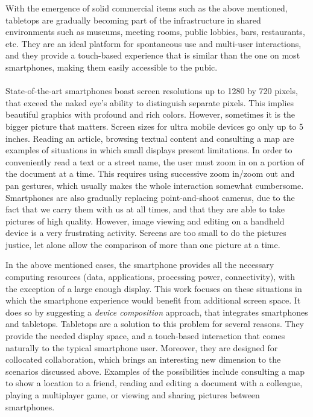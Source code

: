 With the emergence of solid commercial items such as the above mentioned, tabletops are gradually becoming part of the infrastructure in shared environments such as museums, meeting rooms, public lobbies, bars, restaurants, etc.
They are an ideal platform for spontaneous use and multi-user interactions, and they provide a touch-based experience that is similar than the one on most smartphones, making them easily accessible to the pubic.
\\\\
State-of-the-art smartphones boast screen resolutions up to 1280 by 720 pixels, that exceed the naked eye's ability to distinguish separate pixels.
This implies beautiful graphics with profound and rich colors.
However, sometimes it is the bigger picture that matters.
Screen sizes for ultra mobile devices go only up to 5 inches.
Reading an article, browsing textual content and consulting a map are examples of situations in which small displays present limitations.
In order to conveniently read a text or a street name, the user must zoom in on a portion of the document at a time.
This requires using successive zoom in/zoom out and pan gestures, which usually makes the whole interaction somewhat cumbersome.
Smartphones are also gradually replacing point-and-shoot cameras, due to the fact that we carry them with us at all times, and that they are able to take pictures of high quality.
However, image viewing and editing on a handheld device is a very frustrating activity.
Screens are too small to do the pictures justice, let alone allow the comparison of more than one picture at a time.

In the above mentioned cases, the smartphone provides all the necessary computing resources (data, applications, processing power, connectivity), with the exception of a large enough display.
This work focuses on these situations in which the smartphone experience would benefit from additional screen space.
It does so by suggesting a \emph{device composition} approach, that integrates smartphones and tabletops.
Tabletops are a solution to this problem for several reasons.
They provide the needed display space, and a touch-based interaction that comes naturally to the typical smartphone user.
Moreover, they are designed for collocated collaboration, which brings an interesting new dimension to the scenarios discussed above.
Examples of the possibilities include consulting a map to show a location to a friend, reading and editing a document with a colleague, playing a multiplayer game, or viewing and sharing pictures between smartphones.


